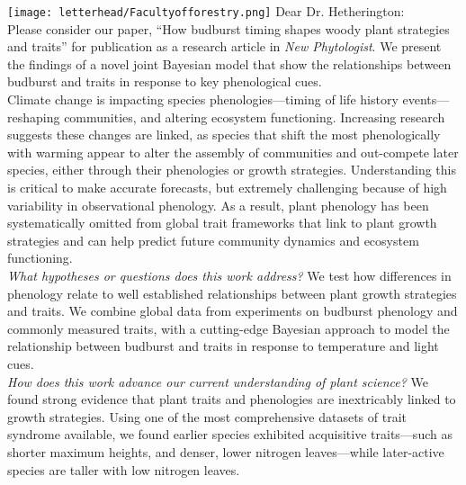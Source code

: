 \documentclass[11pt,a4paper]{article}
\begin{document}
\noindent \texttt{[image: letterhead/Facultyofforestry.png]}
\noindent Dear Dr. Hetherington:
\vspace{1.5ex}\\
\noindent Please consider our paper, ``How budburst timing shapes woody plant strategies and traits'' for publication as a research article in \emph{New Phytologist}. We present the findings of a novel joint Bayesian model that show the relationships between budburst and traits in response to key phenological cues.
\vspace{1.5ex}\\ 
\noindent Climate change is impacting species phenologies---timing of life history events---reshaping communities, and altering ecosystem functioning. Increasing research suggests these changes are linked, as species that shift the most phenologically with warming appear to alter the assembly of communities and out-compete later species, either through their phenologies or growth strategies. Understanding this is critical to make accurate forecasts, but extremely challenging because of high variability in observational phenology. As a result, plant phenology has been systematically omitted from global trait frameworks that link to plant growth strategies and can help predict future community dynamics and ecosystem functioning.
\vspace{1.5ex}\\
\emph{What hypotheses or questions does this work address?} We test how differences in phenology relate to well established relationships between plant growth strategies and traits. We combine global data from experiments on budburst phenology and commonly measured traits, with a cutting-edge Bayesian approach to model the relationship between budburst and traits in response to temperature and light cues.  %
\vspace{1.5ex}\\
\emph{How does this work advance our current understanding of plant science?} We found strong evidence that plant traits and phenologies are inextricably linked to growth strategies. Using one of the most comprehensive datasets of trait syndrome available, we found earlier species exhibited acquisitive traits---such as shorter maximum heights, and denser, lower nitrogen leaves---while later-active species are taller with low nitrogen leaves.
\end{document}
